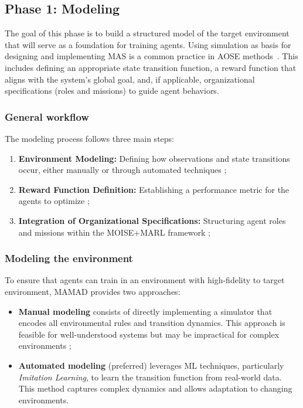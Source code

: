 \documentclass[pdflatex,sn-mathphys-num]{sn-jnl}%
\theoremstyle{thmstyleone}%
\theoremstyle{thmstyletwo}%
\theoremstyle{thmstylethree}%
\begin{document}


\subsection{Phase 1: Modeling}\label{sec:modelling}

The goal of this phase is to build a structured model of the target environment that will serve as a foundation for training agents. Using simulation as basis for designing and implementing MAS is a common practice in AOSE methods~\cite{Jamont2O15}. This includes defining an appropriate state transition function, a reward function that aligns with the system's global goal, and, if applicable, organizational specifications (roles and missions) to guide agent behaviors.

\subsubsection{{General workflow}}
The modeling process follows three main steps:
\begin{enumerate}
    \item \textbf{Environment Modeling:} Defining how observations and state transitions occur, either manually or through automated techniques ;
    \item \textbf{Reward Function Definition:} Establishing a performance metric for the agents to optimize ;
    \item \textbf{Integration of Organizational Specifications:} Structuring agent roles and missions within the MOISE+MARL framework ;
\end{enumerate}

\subsubsection{Modeling the environment}

To ensure that agents can train in an environment with high-fidelity to target environment, MAMAD provides two approaches:
\begin{itemize}
    \item \textbf{Manual modeling} consists of directly implementing a simulator that encodes all environmental rules and transition dynamics. This approach is feasible for well-understood systems but may be impractical for complex environments ;
    \item \textbf{Automated modeling} (preferred) leverages ML techniques, particularly \textit{Imitation Learning}, to learn the transition function from real-world data. This method captures complex dynamics and allows adaptation to changing environments.
\end{itemize}
\end{document}
